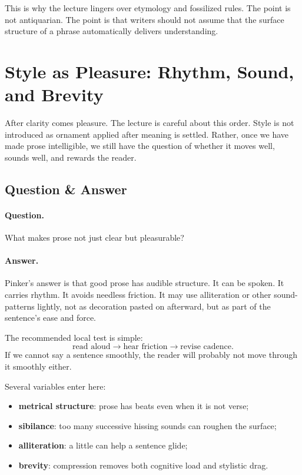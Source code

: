 This is why the lecture lingers over etymology and fossilized rules. The point is not antiquarian. The point is that writers should not assume that the surface structure of a phrase automatically delivers understanding.

\section{Style as Pleasure: Rhythm, Sound, and Brevity}

After clarity comes pleasure. The lecture is careful about this order. Style is not introduced as ornament applied after meaning is settled. Rather, once we have made prose intelligible, we still have the question of whether it moves well, sounds well, and rewards the reader.

\subsection{Question \& Answer}

\paragraph{Question.} What makes prose not just clear but pleasurable?

\paragraph{Answer.} Pinker's answer is that good prose has audible structure. It can be spoken. It carries rhythm. It avoids needless friction. It may use alliteration or other sound-patterns lightly, not as decoration pasted on afterward, but as part of the sentence's ease and force.

The recommended local test is simple:
\begin{equation}
\text{read aloud} \to \text{hear friction} \to \text{revise cadence}.
\end{equation}
If we cannot say a sentence smoothly, the reader will probably not move through it smoothly either.

Several variables enter here:
\begin{itemize}
\item \textbf{metrical structure}: prose has beats even when it is not verse;
\item \textbf{sibilance}: too many successive hissing sounds can roughen the surface;
\item \textbf{alliteration}: a little can help a sentence glide;
\item \textbf{brevity}: compression removes both cognitive load and stylistic drag.
\end{itemize}

